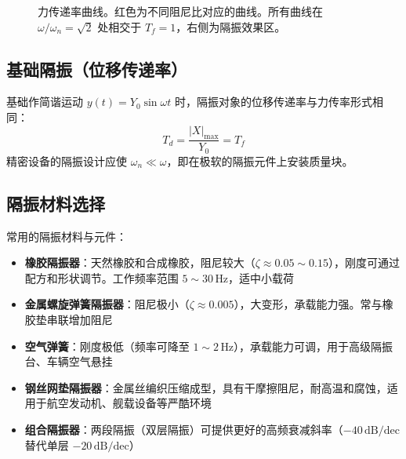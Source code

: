 \begin{figure}[H]
\centering
{}
\caption{力传递率曲线。红色为不同阻尼比对应的曲线。所有曲线在 $\omega/\omega_n = \sqrt{2}$ 处相交于 $T_f = 1$，右侧为隔振效果区。}
\label{fig:ch12_transmissibility}
\end{figure}

\subsection{基础隔振（位移传递率）}
基础作简谐运动 $y(t) = Y_0\sin\omega t$ 时，隔振对象的位移传递率与力传率形式相同：
\[
T_d = \frac{|X|_{\max}}{Y_0} = T_f
\]
精密设备的隔振设计应使 $\omega_n \ll \omega$，即在极软的隔振元件上安装质量块。

\subsection{隔振材料选择}
常用的隔振材料与元件：

\begin{itemize}
    \item \textbf{橡胶隔振器}：天然橡胶和合成橡胶，阻尼较大（$\zeta \approx 0.05 \sim 0.15$），刚度可通过配方和形状调节。工作频率范围 $5 \sim 30\,\text{Hz}$，适中小载荷
    \item \textbf{金属螺旋弹簧隔振器}：阻尼极小（$\zeta \approx 0.005$），大变形，承载能力强。常与橡胶垫串联增加阻尼
    \item \textbf{空气弹簧}：刚度极低（频率可降至 $1 \sim 2\,\text{Hz}$），承载能力可调，用于高级隔振台、车辆空气悬挂
    \item \textbf{钢丝网垫隔振器}：金属丝编织压缩成型，具有干摩擦阻尼，耐高温和腐蚀，适用于航空发动机、舰载设备等严酷环境
    \item \textbf{组合隔振器}：两段隔振（双层隔振）可提供更好的高频衰减斜率（$-40\,\text{dB/dec}$ 替代单层  ${-20}\,\text{dB/dec}$）
\end{itemize}

